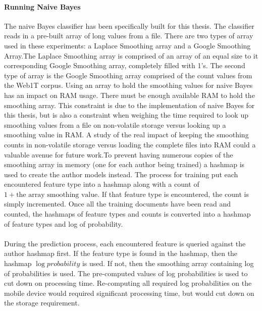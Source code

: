 	\paragraph{Running Naive Bayes} The naive Bayes classifier has been specifically built for this thesis.  The classifier reads in a pre-built array of long values from a file.  There are two types of array used in these experiments: a Laplace Smoothing array and a Google Smoothing Array.The Laplace Smoothing array is comprised of an array of an equal size to it corresponding Google Smoothing array, completely filled with 1's. The second type of array is the Google Smoothing array comprised of the count values from the Web1T corpus.  Using an array to hold the smoothing values for naive Bayes has an impact on RAM usage.  There must be enough available RAM to hold the smoothing array.  This constraint is due to the implementation of naive Bayes for this thesis, but is also a constraint when weighing the time required to look up smoothing values from a file on non-volatile storage versus looking up a smoothing value in RAM.  A study of the real impact of keeping the smoothing counts in non-volatile storage versus loading the complete files into RAM could a valuable avenue for future work.To prevent having numerous copies of the smoothing array in memory (one for each author being trained) a hashmap is used to create the author models instead.  The process for training put each encountered feature type into a hashmap along with a count of $1 +  \text{the array smoothing value}$.  If that feature type is encountered, the count is simply incremented. Once all the training documents have been read and counted, the hashmaps of feature types and counts is converted into a hashmap of feature types and log of probability.
	
	\paragraph{}During the prediction process, each encountered feature is queried against the author hashmap first.  If the feature type is found in the hashmap, then the hashmap $\log{probability}$ is used.  If not, then the smoothing array containing log of probabilities is used.  The pre-computed values of log probabilities is used to cut down on processing time.  Re-computing all required log probabilities on the mobile device would required significant processing time, but would cut down on the storage requirement. 
